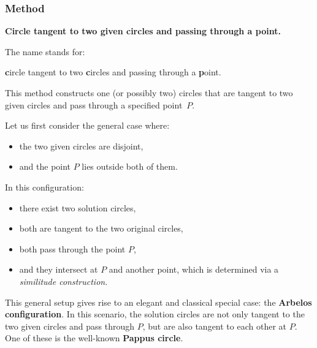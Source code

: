 
\subsubsection{Method } %
\label{ssub:method_c_cc_p}
\textbf{Circle tangent to two given circles and passing through a point.}

\medskip
\noindent
The name  stands for:

\begin{center}
\textbf{c}ircle tangent to two \textbf{c}ircles and passing through a \textbf{p}oint.
\end{center}

\medskip
\noindent
This method constructs one (or possibly two) circles that are tangent to two given circles and pass through a specified point~$P$.

\medskip
\noindent
Let us first consider the general case where:
\begin{itemize}
  \item the two given circles are disjoint,
  \item and the point $P$ lies outside both of them.
\end{itemize}

\noindent
In this configuration:
\begin{itemize}
  \item there exist two solution circles,
  \item both are tangent to the two original circles,
  \item both pass through the point $P$,
  \item and they intersect at $P$ and another point, which is determined via a \emph{similitude construction}.
\end{itemize}

\medskip
\noindent
This general setup gives rise to an elegant and classical special case: the \textbf{Arbelos configuration}. In this scenario, the solution circles are not only tangent to the two given circles and pass through $P$, but are also tangent to each other at $P$. One of these is the well-known \textbf{Pappus circle}.

\vspace{1em}

